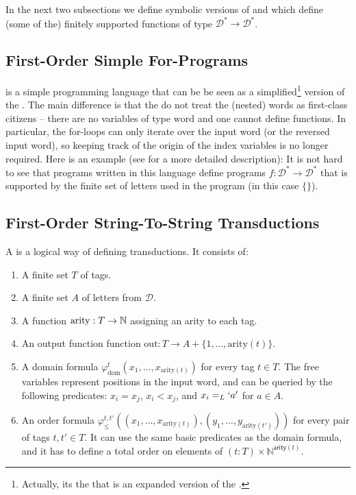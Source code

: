 In the next two subsections we define symbolic versions of  and  which 
define (some of the) finitely supported functions of type $\mathcal{D}^* \to \mathcal{D}^*$. 


\subsection{First-Order Simple For-Programs}
 is a simple programming language that can be be seen
as a simplified\footnote{Actually, its the  that is an expanded version of the .}
version of the .
The main difference is that the  do not treat the (nested) words as first-class citizens -- there are no variables 
of type $\text{word}$ and one cannot define functions. In particular, the for-loops can only iterate over the input word (or the reversed input word),
so keeping track of the origin of the index variables is no longer required. Here is an example (see \cite{bojanczyk2018polyregular}
for a more detailed description):
It is not hard to see that programs written in this language define programs $f : \mathcal{D}^* \to \mathcal{D}^*$ that is supported by the 
finite set of letters used in the program (in this case $\{ \}$). 

\subsection{First-Order String-To-String Transductions}

\AP
A  is a logical way of defining transductions. It consists of: 

\begin{enumerate}
\item A finite set $T$ of tags.
\item A finite set $A$ of letters from $\mathcal{D}$.
\item A function $\text{arity} : T \to \mathbb{N}$ assigning an arity to each tag.
\item An output function function $\text{out} : T \to A + \{1, \ldots, \text{arity}(t)\}$. 
\item A domain formula $\varphi_{\text{dom}}^t(x_1,\ldots,x_{\text{arity}(t)})$ for every tag $t \in T$.
      The free variables represent positions in the input word, and can be queried by the following predicates: 
      $x_i = x_j$, $x_i < x_j$, and $x_i =_L `a'$ for $a \in A$.
\item An order formula $\varphi_{\leq}^{t,t'}((x_1,\ldots,x_{\text{arity}(t)}),(y_1,\ldots,y_{\text{arity}(t')}))$ for every pair of tags $t,t' \in T$. 
      It can use the same basic predicates as the domain formula, and it has to define a total order on elements of $(t : T) \times \mathbb{N}^{\mathsf{arity}(t)}$.
\end{enumerate}

